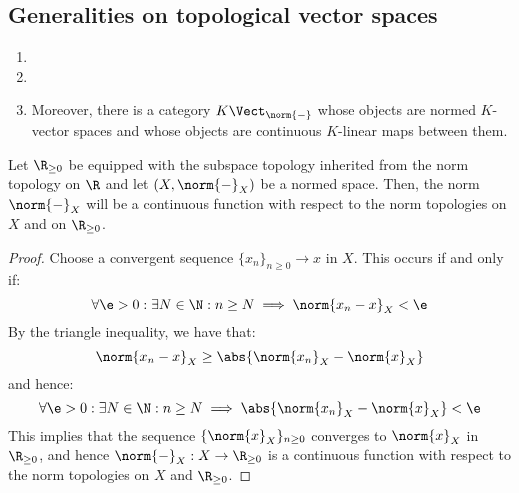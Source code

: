     \subsection{Generalities on topological vector spaces}
        \begin{definition} \label{def: normed_spaces}
            \begin{enumerate}
                \item 
                \item 
                \item Moreover, there is a category $K\-\Vect_{\norm{-}}$ whose objects are normed $K$-vector spaces and whose objects are continuous $K$-linear maps between them. 
            \end{enumerate}
        \end{definition}
        \begin{lemma} \label{lemma: norms_are_continuous}
            Let $\R_{\geq 0}$ be equipped with the subspace topology inherited from the norm topology on $\R$ and let $(X, \norm{-}_X)$ be a normed space. Then, the norm $\norm{-}_X$ will be a continuous function with respect to the norm topologies on $X$ and on $\R_{\geq 0}$.
        \end{lemma}
            \begin{proof}
                Choose a convergent sequence $\{x_n\}_{n \geq 0} \to x$ in $X$. This occurs if and only if:
                    $$\forall \e > 0: \exists N \in \N: n \geq N \implies \norm{x_n - x}_X < \e$$
                By the triangle inequality, we have that:
                    $$\norm{x_n - x}_X \geq \abs{ \norm{x_n}_X - \norm{x}_X }$$
                and hence:
                    $$\forall \e > 0: \exists N \in \N: n \geq N \implies \abs{ \norm{x_n}_X - \norm{x}_X } < \e$$
                This implies that the sequence $\{ \norm{x}_X \}_{n \geq 0}$ converges to $\norm{x}_X$ in $\R_{\geq 0}$, and hence $\norm{-}_X: X \to \R_{\geq 0}$ is a continuous function with respect to the norm topologies on $X$ and $\R_{\geq 0}$.
            \end{proof}

